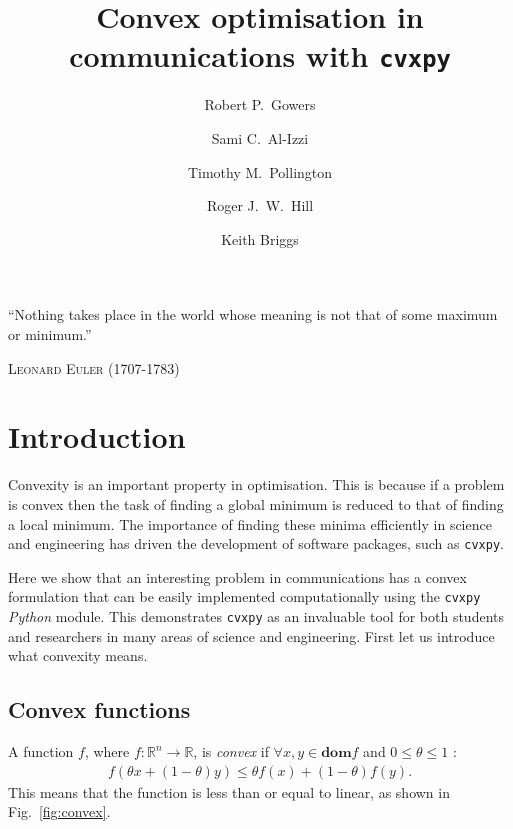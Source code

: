 \documentclass[twocolumn,secnumarabic,amssymb, nobibnotes, aps, prl,superscriptaddress]{revtex4-1}
\newcommand{\NewsItem}[1]{%
		\large #1 \vspace{4pt}
		\par \normalsize \normalfont}
\newcommand{\NewsAuthor}[1]{%
			\hfill \textsc{#1} \vspace{4pt}
			\par \normalfont}
\begin{document}

\title{Convex optimisation in communications with \texttt{cvxpy}}
\author{Robert P.~Gowers}%
\author{Sami C.~Al-Izzi}%
\author{Timothy M.~Pollington}%
\author{Roger J.~W.~Hill}%
\author{Keith Briggs}
\maketitle


	\NewsItem{\noindent``Nothing takes place in the world whose meaning is not that of some maximum or minimum.''}
	\NewsAuthor{Leonard Euler (1707-1783)}
    
\section{Introduction}
\noindent Convexity is an important property in optimisation. This is because if a problem is convex then the task of finding a global minimum is reduced to that of finding a local minimum. The importance of finding these minima efficiently in science and engineering has driven the development of software packages, such as \texttt{cvxpy}.

Here we show that an interesting problem in communications has a convex formulation that can be easily implemented computationally using the \texttt{cvxpy} \textit{Python} module. This demonstrates \texttt{cvxpy} as an invaluable tool for both students and researchers in many areas of science and engineering. First let us introduce what convexity means.

\subsection{Convex functions}

\noindent A function $f$, where $f:\mathbb{R}^n \rightarrow \mathbb{R}$, is \textit{convex} if $\forall x,y\in \textbf{dom} f$ and $0 \leq \theta \leq 1$ \cite[p.67]{cvxpybook}:
\begin{align}
f(\theta x + (1-\theta)y) \leq \theta f(x)+(1-\theta)f(y).
\end{align}
This means that the function is less than or equal to linear, as shown in Fig.~\ref{fig:convex}. %
\end{document}
